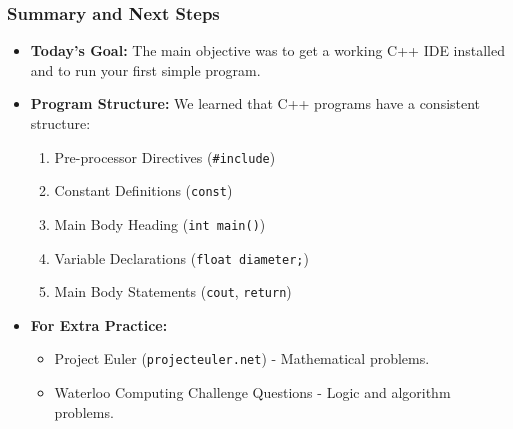 \documentclass{beamer}
\begin{document}
\begin{frame}
\frametitle{Summary and Next Steps}
\begin{itemize}
\item \textbf{Today's Goal:} The main objective was to get a working C++ IDE installed and to run your first simple program.
\item \textbf{Program Structure:} We learned that C++ programs have a consistent structure:
\begin{enumerate}
\item Pre-processor Directives (\texttt{#include})
\item Constant Definitions (\texttt{const})
\item Main Body Heading (\texttt{int main()})
\item Variable Declarations (\texttt{float diameter;})
\item Main Body Statements (\texttt{cout}, \texttt{return})
\end{enumerate}
\item \textbf{For Extra Practice:}
\begin{itemize}
\item Project Euler (\texttt{projecteuler.net}) - Mathematical problems.
\item Waterloo Computing Challenge Questions - Logic and algorithm problems.
\end{itemize}
\end{itemize}
\end{frame}
\end{document}
